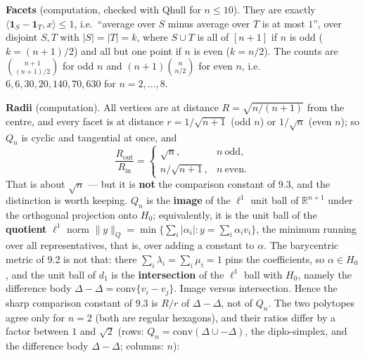 \documentclass[
]{article}
\begin{document}
\textbf{Facets} (computation, checked with Qhull for \(n\le 10\)). They
are exactly \(\langle\mathbf 1_S-\mathbf 1_T,x\rangle\le 1\),
i.e.~``average over \(S\) minus average over \(T\) is at most \(1\)'',
over disjoint \(S,T\) with \(\lvert S\rvert=\lvert T\rvert=k\), where
\(S\cup T\) is all of \([n+1]\) if \(n\) is odd (\(k=(n+1)/2\)) and all
but one point if \(n\) is even (\(k=n/2\)). The counts are
\(\binom{n+1}{(n+1)/2}\) for odd \(n\) and \((n+1)\binom{n}{n/2}\) for
even \(n\), i.e.~\(6,6,30,20,140,70,630\) for \(n=2,\dots,8\).

\textbf{Radii} (computation). All vertices are at distance
\(R=\sqrt{n/(n+1)}\) from the centre, and every facet is at distance
\(r=1/\sqrt{n+1}\) (odd \(n\)) or \(1/\sqrt n\) (even \(n\)); so \(Q_n\)
is cyclic and tangential at once, and \[
\frac{R_{\text{out}}}{R_{\text{in}}}=\begin{cases}\sqrt n, & n\ \text{odd},\\[2pt] n/\sqrt{n+1}, & n\ \text{even}.\end{cases}
\] That is about \(\sqrt n\) --- but it is \textbf{not} the comparison
constant of 9.3, and the distinction is worth keeping. \(Q_n\) is the
\textbf{image} of the \(\ell^1\) unit ball of \(\mathbb R^{n+1}\) under
the orthogonal projection onto \(H_0\); equivalently, it is the unit
ball of the \textbf{quotient} \(\ell^1\) norm
\(\lVert y\rVert_Q=\min\{\sum_i\lvert\alpha_i\rvert : y=\sum_i\alpha_i v_i\}\),
the minimum running over all representatives, that is, over adding a
constant to \(\alpha\). The barycentric metric of 9.2 is not that: there
\(\sum_i\lambda_i=\sum_i\mu_i=1\) pins the coefficients, so
\(\alpha\in H_0\), and the unit ball of \(d_1\) is the
\textbf{intersection} of the \(\ell^1\) ball with \(H_0\), namely the
difference body \(\Delta-\Delta=\mathrm{conv}\{v_i-v_j\}\). Image versus
intersection. Hence the sharp comparison constant of 9.3 is \(R/r\) of
\(\Delta-\Delta\), not of \(Q_n\). The two polytopes agree only for
\(n=2\) (both are regular hexagons), and their ratios differ by a factor
between \(1\) and \(\sqrt2\) (rows:
\(Q_n=\mathrm{conv}(\Delta\cup-\Delta)\), the diplo-simplex, and the
difference body \(\Delta-\Delta\); columns: \(n\)):
\end{document}
